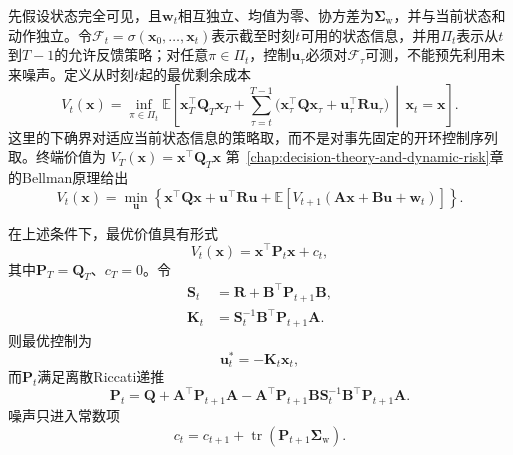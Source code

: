 先假设状态完全可见，且$\bm{w}_t$相互独立、均值为零、协方差为$\bm{\Sigma}_{\mathrm{w}}$，并与当前状态和动作独立。令$\mathcal{F}_t=\sigma(\bm{x}_0,\ldots,\bm{x}_t)$表示截至时刻$t$可用的状态信息，并用$\Pi_t$表示从$t$到$T-1$的允许反馈策略；对任意$\pi\in\Pi_t$，控制$\bm{u}_{\tau}$必须对$\mathcal{F}_{\tau}$可测，不能预先利用未来噪声。定义从时刻$t$起的最优剩余成本
\[
  V_t(\bm{x})
  =
  \inf_{\pi\in\Pi_t}
  \mathbb{E}\left[
    \bm{x}_T^{\top}\bm{Q}_T\bm{x}_T
    +
    \sum_{\tau=t}^{T-1}
    \bigl(
      \bm{x}_{\tau}^{\top}\bm{Q}\bm{x}_{\tau}
      +
      \bm{u}_{\tau}^{\top}\bm{R}\bm{u}_{\tau}
    \bigr)
    \,\middle|\,\bm{x}_t=\bm{x}
  \right].
\]
这里的下确界对适应当前状态信息的策略取，而不是对事先固定的开环控制序列取。终端价值为
$V_T(\bm{x})=\bm{x}^{\top}\bm{Q}_T\bm{x}$
第~\ref{chap:decision-theory-and-dynamic-risk}章的Bellman原理给出
\begin{equation}
  V_t(\bm{x})
  =
  \min_{\bm{u}}
  \left\{
    \bm{x}^{\top}\bm{Q}\bm{x}
    +
    \bm{u}^{\top}\bm{R}\bm{u}
    +
    \mathbb{E}
    \left[
      V_{t+1}(
        \bm{A}\bm{x}+\bm{B}\bm{u}+\bm{w}_t)
    \right]
  \right\}.
  \label{eq:control-lqr-bellman}
\end{equation}
\begin{theorem}[有限时域LQR与Riccati递推]
\label{thm:control-finite-horizon-lqr}
在上述条件下，最优价值具有形式
\[
  V_t(\bm{x})
  =
  \bm{x}^{\top}\bm{P}_t\bm{x}+c_t,
\]
其中$\bm{P}_T=\bm{Q}_T$、$c_T=0$。令
\begin{equation}
  \begin{aligned}
    \bm{S}_t
      &=
      \bm{R}+\bm{B}^{\top}\bm{P}_{t+1}\bm{B},\\
    \bm{K}_t
      &=
      \bm{S}_t^{-1}
      \bm{B}^{\top}\bm{P}_{t+1}\bm{A}.
  \end{aligned}
  \label{eq:control-lqr-gain}
\end{equation}
则最优控制为
\[
  \bm{u}_t^{\ast}=-\bm{K}_t\bm{x}_t,
\]
而$\bm{P}_t$满足离散Riccati递推
\begin{equation}
  \bm{P}_t
  =
  \bm{Q}
  +
  \bm{A}^{\top}\bm{P}_{t+1}\bm{A}
  -
  \bm{A}^{\top}\bm{P}_{t+1}\bm{B}
  \bm{S}_t^{-1}
  \bm{B}^{\top}\bm{P}_{t+1}\bm{A}.
  \label{eq:control-discrete-riccati-recursion}
\end{equation}
噪声只进入常数项
\begin{equation}
  c_t
  =
  c_{t+1}
  +
  \operatorname{tr}(\bm{P}_{t+1}\bm{\Sigma}_{\mathrm{w}}).
  \label{eq:control-lqr-noise-constant}
\end{equation}
\end{theorem}
